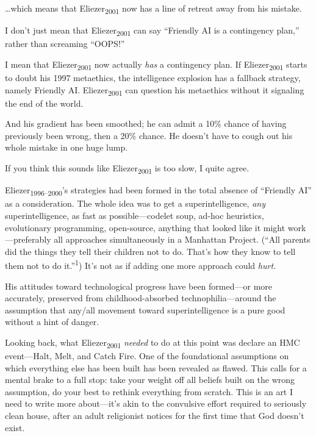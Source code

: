{
 \ldots which means that Eliezer\textsubscript{2001} now has a line
of retreat away from his mistake.}

{
 I don't just mean that Eliezer\textsubscript{2001}
can say ``Friendly AI is a contingency
plan,'' rather than screaming
``OOPS!''}

{
 I mean that Eliezer\textsubscript{2001} now actually \textit{has}
a contingency plan. If Eliezer\textsubscript{2001} starts to doubt his
1997 metaethics, the intelligence explosion has a fallback strategy,
namely Friendly AI. Eliezer\textsubscript{2001} can question his
metaethics without it signaling the end of the world.}

{
 And his gradient has been smoothed; he can admit a 10\% chance of
having previously been wrong, then a 20\% chance. He
doesn't have to cough out his whole mistake in one huge
lump.}

{
 If you think this sounds like Eliezer\textsubscript{2001} is too
slow, I quite agree.}

{
 Eliezer\textsubscript{1996--2000}'s strategies had
been formed in the total absence of ``Friendly
AI'' as a consideration. The whole idea was to get a
superintelligence, \textit{any} superintelligence, as fast as
possible---codelet soup, ad-hoc heuristics, evolutionary programming,
open-source, anything that looked like it might work---preferably all
approaches simultaneously in a Manhattan Project.
(``All parents did the things they tell their children
not to do. That's how they know to tell them not to do
it.''\textsuperscript{1}) It's not as
if adding one more approach could \textit{hurt.}}

{
 His attitudes toward technological progress have been formed---or
more accurately, preserved from childhood-absorbed
technophilia---around the assumption that any/all movement toward
superintelligence is a pure good without a hint of danger.}

{
 Looking back, what Eliezer\textsubscript{2001} \textit{needed} to
do at this point was declare an HMC event---Halt, Melt, and Catch Fire.
One of the foundational assumptions on which everything else has been
built has been revealed as flawed. This calls for a mental brake to a
full stop: take your weight off all beliefs built on the wrong
assumption, do your best to rethink everything from scratch. This is an
art I need to write more about---it's akin to the
convulsive effort required to seriously clean house, after an adult
religionist notices for the first time that God doesn't
exist.}

